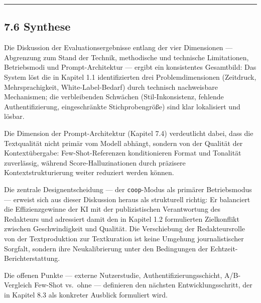 \begin{center}\rule{0.5\linewidth}{0.5pt}\end{center}

\subsection{7.6 Synthese}\label{synthese}

Die Diskussion der Evaluationsergebnisse entlang der vier Dimensionen
--- Abgrenzung zum Stand der Technik, methodische und technische
Limitationen, Betriebsmodi und Prompt-Architektur --- ergibt ein
konsistentes Gesamtbild: Das System löst die in Kapitel 1.1
identifizierten drei Problemdimensionen (Zeitdruck, Mehrsprachigkeit,
White-Label-Bedarf) durch technisch nachweisbare Mechanismen; die
verbleibenden Schwächen (Stil-Inkonsistenz, fehlende Authentifizierung,
eingeschränkte Stichprobengröße) sind klar lokalisiert und lösbar.

Die Dimension der Prompt-Architektur (Kapitel 7.4) verdeutlicht dabei,
dass die Textqualität nicht primär vom Modell abhängt, sondern von der
Qualität der Kontextübergabe: Few-Shot-Referenzen konditionieren Format
und Tonalität zuverlässig, während Score-Halluzinationen durch präzisere
Kontextstrukturierung weiter reduziert werden können.

Die zentrale Designentscheidung --- der
\passthrough{\lstinline!coop!}-Modus als primärer Betriebsmodus ---
erweist sich aus dieser Diskussion heraus als strukturell richtig: Er
balanciert die Effizienzgewinne der KI mit der publizistischen
Verantwortung des Redakteurs und adressiert damit den in Kapitel 1.2
formulierten Zielkonflikt zwischen Geschwindigkeit und Qualität. Die
Verschiebung der Redakteursrolle von der Textproduktion zur Textkuration
ist keine Umgehung journalistischer Sorgfalt, sondern ihre
Neukalibrierung unter den Bedingungen der Echtzeit-Berichterstattung.

Die offenen Punkte --- externe Nutzerstudie, Authentifizierungsschicht,
A/B-Vergleich Few-Shot vs.~ohne --- definieren den nächsten
Entwicklungsschritt, der in Kapitel 8.3 als konkreter Ausblick
formuliert wird.
